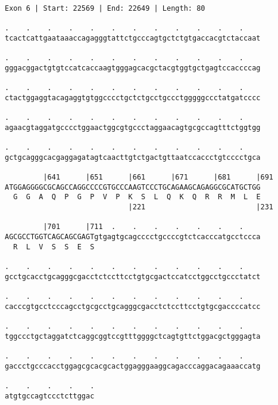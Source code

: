 \documentclass{article}
\begin{document}
\newpage
\begin{Verbatim}[fontfamily=courier]
Exon 6 | Start: 22569 | End: 22649 | Length: 80

.    .    .    .    .    .    .    .    .    .    .    .    
tcactcattgaataaaccagagggtattctgcccagtgctctgtgaccacgtctaccaat

.    .    .    .    .    .    .    .    .    .    .    .    
gggacggactgtgtccatcaccaagtgggagcacgctacgtggtgctgagtccaccccag

.    .    .    .    .    .    .    .    .    .    .    .    
ctactggaggtacagaggtgtggcccctgctctgcctgccctgggggccctatgatcccc

.    .    .    .    .    .    .    .    .    .    .    .    
agaacgtaggatgcccctggaactggcgtgccctaggaacagtgcgccagtttctggtgg

.    .    .    .    .    .    .    .    .    .    .    .    
gctgcagggcacgaggagatagtcaacttgtctgactgttaatccaccctgtcccctgca

         |641      |651      |661      |671      |681      |691
ATGGAGGGGCGCAGCCAGGCCCCGTGCCCAAGTCCCTGCAGAAGCAGAGGCGCATGCTGG
  G  G  A  Q  P  G  P  V  P  K  S  L  Q  K  Q  R  R  M  L  E
                             |221                          |231

         |701      |711  .    .    .    .    .    .    .    
AGCGCCTGGTCAGCAGCGAGTgtgagtgcagcccctgccccgtctcacccatgcctccca
  R  L  V  S  S  E  S                                       

.    .    .    .    .    .    .    .    .    .    .    .    
gcctgcacctgcagggcgacctctccttcctgtgcgactccatcctggcctgccctatct

.    .    .    .    .    .    .    .    .    .    .    .    
cacccgtgcctcccagcctgcgcctgcagggcgacctctccttcctgtgcgaccccatcc

.    .    .    .    .    .    .    .    .    .    .    .    
tggccctgctaggatctcaggcggtccgtttggggctcagtgttctggacgctgggagta

.    .    .    .    .    .    .    .    .    .    .    .    
gaccctgcccacctggagcgcacgcactggagggaaggcagacccaggacagaaaccatg

.    .    .    .    .
atgtgccagtccctcttggac
\end{Verbatim}
\newpage
\end{document}
